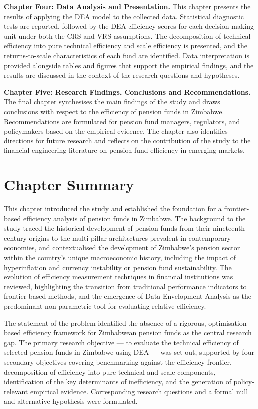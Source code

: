 \documentclass[12pt,a4paper]{article}
\begin{document}
\textbf{Chapter Four: Data Analysis and Presentation.} This chapter presents the results of applying the DEA model to the collected data. Statistical diagnostic tests are reported, followed by the DEA efficiency scores for each decision-making unit under both the CRS and VRS assumptions. The decomposition of technical efficiency into pure technical efficiency and scale efficiency is presented, and the returns-to-scale characteristics of each fund are identified. Data interpretation is provided alongside tables and figures that support the empirical findings, and the results are discussed in the context of the research questions and hypotheses.

\textbf{Chapter Five: Research Findings, Conclusions and Recommendations.} The final chapter synthesises the main findings of the study and draws conclusions with respect to the efficiency of pension funds in Zimbabwe. Recommendations are formulated for pension fund managers, regulators, and policymakers based on the empirical evidence. The chapter also identifies directions for future research and reflects on the contribution of the study to the financial engineering literature on pension fund efficiency in emerging markets.

\section{Chapter Summary}

This chapter introduced the study and established the foundation for a frontier-based efficiency analysis of pension funds in Zimbabwe. The background to the study traced the historical development of pension funds from their nineteenth-century origins to the multi-pillar architectures prevalent in contemporary economies, and contextualised the development of Zimbabwe's pension sector within the country's unique macroeconomic history, including the impact of hyperinflation and currency instability on pension fund sustainability. The evolution of efficiency measurement techniques in financial institutions was reviewed, highlighting the transition from traditional performance indicators to frontier-based methods, and the emergence of Data Envelopment Analysis as the predominant non-parametric tool for evaluating relative efficiency.

The statement of the problem identified the absence of a rigorous, optimisation-based efficiency framework for Zimbabwean pension funds as the central research gap. The primary research objective --- to evaluate the technical efficiency of selected pension funds in Zimbabwe using DEA --- was set out, supported by four secondary objectives covering benchmarking against the efficiency frontier, decomposition of efficiency into pure technical and scale components, identification of the key determinants of inefficiency, and the generation of policy-relevant empirical evidence. Corresponding research questions and a formal null and alternative hypothesis were formulated.
\end{document}
